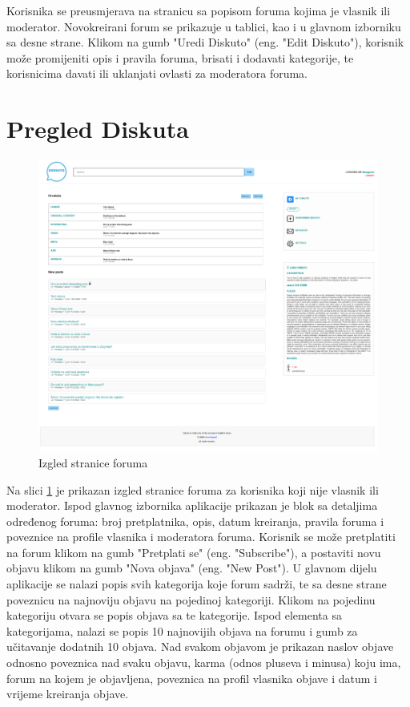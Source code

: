\documentclass{foi}
\begin{document}
Korisnika se preusmjerava na stranicu sa popisom foruma kojima je vlasnik ili moderator. Novokreirani forum se prikazuje u tablici, kao i u glavnom izborniku sa desne strane. Klikom na gumb "Uredi Diskuto" (eng. "Edit Diskuto"), korisnik može promijeniti opis i pravila foruma, brisati i dodavati kategorije, te korisnicima davati ili uklanjati ovlasti za moderatora foruma.

\section{Pregled Diskuta}

\begin{figure}[h!]
    \centering
    \includegraphics[width=1\textwidth]{slike/forum.png}
    \caption{Izgled stranice foruma}
    \label{forum}
\end{figure}

Na slici \ref{forum} je prikazan izgled stranice foruma za korisnika koji nije vlasnik ili moderator. Ispod glavnog izbornika aplikacije prikazan je blok sa detaljima određenog foruma: broj pretplatnika, opis, datum kreiranja, pravila foruma i poveznice na profile vlasnika i moderatora foruma.  Korisnik se može pretplatiti na forum klikom na gumb "Pretplati se" (eng. "Subscribe"), a postaviti novu objavu klikom na gumb "Nova objava" (eng. "New Post"). U glavnom dijelu aplikacije se nalazi popis svih kategorija koje forum sadrži, te sa desne strane poveznicu na najnoviju objavu na pojedinoj kategoriji. Klikom na pojedinu kategoriju otvara se popis objava sa te kategorije. Ispod elementa sa kategorijama, nalazi se popis 10 najnovijih objava na forumu i gumb za učitavanje dodatnih 10 objava. Nad svakom objavom je prikazan naslov objave odnosno poveznica nad svaku objavu, karma (odnos pluseva i minusa) koju ima, forum na kojem je objavljena, poveznica na profil vlasnika objave i datum i vrijeme kreiranja objave.
\end{document}
